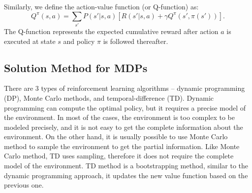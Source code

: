 Similarly, we define the action-value function (or Q-function) as:
\begin{equation}
    Q^{\pi}(s, a) = \sum_{s'}P(s'|s, a)[R(s'|s, a) + \gamma Q^{\pi}(s', \pi(s'))].
    \label{eq:Q}
\end{equation}
The Q-function represents the expected cumulative reward after action $a$ is executed at state $s$ and 
policy $\pi$ is followed thereafter.






\subsection{Solution Method for MDPs}

There are 3 types of reinforcement learning algorithms -- dynamic programming (DP), Monte Carlo 
methods, and temporal-difference (TD). Dynamic programming can compute the optimal policy, but it 
requires a precise model of the environment. In most of the cases, the environment
is too complex to be modeled precisely, and it is not easy to get the complete information about
the environment. On the other hand, it is usually possible to use Monte Carlo method to sample the environment to
get the partial information. 
Like Monte Carlo method, TD uses sampling, therefore it does not require the 
complete model of the environment. TD method is a bootstrapping method, similar to the dynamic 
programming approach, it updates the new value function based on the previous one.

